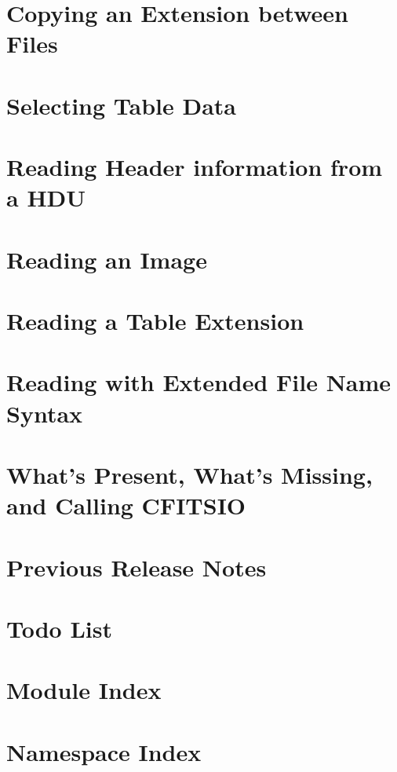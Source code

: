 \documentclass[letterpaper]{article}
\begin{document}
\section{Copying an Extension between Files}
\label{copy}
\hypertarget{copy}{}

\section{Selecting Table Data}
\label{filter}
\hypertarget{filter}{}

\section{Reading Header information from a HDU}
\label{readhead}
\hypertarget{readhead}{}

\section{Reading an Image}
\label{readimage}
\hypertarget{readimage}{}

\section{Reading a Table Extension}
\label{readtable}
\hypertarget{readtable}{}

\section{Reading with Extended File Name Syntax}
\label{readextendedsyntax}
\hypertarget{readextendedsyntax}{}

\section{What's Present, What's Missing, and Calling CFITSIO}
\label{missing}
\hypertarget{missing}{}

\section{Previous Release Notes}
\label{releases}
\hypertarget{releases}{}

\section{Todo List}
\label{todo}
\hypertarget{todo}{}

\section{Module Index}

\section{Namespace Index}

\end{document}
